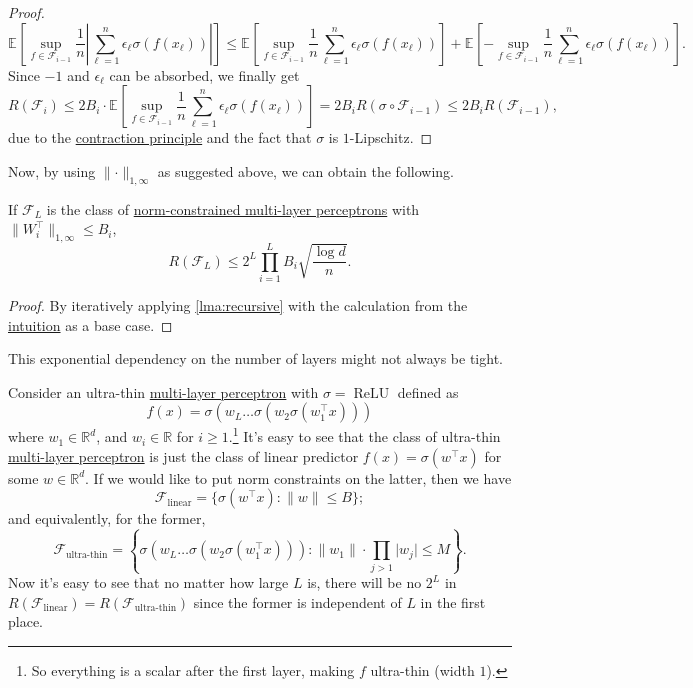 \begin{proof}
	\[
		\mathbb{E}_{}\left[ \sup _{f\in \mathscr{F} _{i-1}} \frac{1}{n} \left\vert \sum_{\ell = 1}^{n} \epsilon _{\ell } \sigma (f(x_{\ell })) \right\vert \right]
		\leq \mathbb{E}_{}\left[\sup _{f\in \mathscr{F} _{i-1}} \frac{1}{n} \sum_{\ell = 1}^{n} \epsilon _{\ell } \sigma (f(x_{\ell })) \right] + \mathbb{E}_{}\left[-\sup _{f\in \mathscr{F} _{i-1}} \frac{1}{n} \sum_{\ell = 1}^{n} \epsilon _{\ell } \sigma (f(x_{\ell })) \right] .
	\]
	Since \(-1\) and \(\epsilon _{\ell }\) can be absorbed, we finally get
	\[
		R(\mathscr{F} _i)
		\leq 2 B_i \cdot \mathbb{E}_{}\left[\sup _{f\in \mathscr{F} _{i-1}} \frac{1}{n} \sum_{\ell = 1}^{n} \epsilon _{\ell } \sigma (f(x_{\ell })) \right]
		= 2 B_i R(\sigma \circ \mathscr{F} _{i-1})
		\leq 2 B_i R(\mathscr{F} _{i-1}),
	\]
	due to the \hyperref[thm:contraction-principle]{contraction principle} and the fact that \(\sigma \) is \(1\)-Lipschitz.
\end{proof}

Now, by using \(\lVert \cdot \rVert _{1, \infty }\) as suggested above, we can obtain the following.

\begin{corollary}
	If \(\mathscr{F} _L\) is the class of \hyperref[def:norm-MLP]{norm-constrained multi-layer perceptrons} with \(\lVert W_i ^{\top} \rVert _{1, \infty } \leq B_i\),
	\[
		R(\mathscr{F} _L) \leq 2^L \prod _{i=1}^{L} B_i \sqrt{\frac{\log d}{n}} .
	\]
\end{corollary}
\begin{proof}
	By iteratively applying \autoref{lma:recursive} with the calculation from the \hyperref[int:recursive]{intuition} as a base case.
\end{proof}

This exponential dependency on the number of layers might not always be tight.

\begin{eg}
	Consider an ultra-thin \hyperref[def:MLP]{multi-layer perceptron} with \(\sigma = \operatorname{ReLU}\) defined as
	\[
		f(x) = \sigma (w_L \dots \sigma (w_2 \sigma (w_1 ^{\top} x)))
	\]
	where \(w_1 \in \mathbb{R} ^d\), and \(w_i \in \mathbb{R} \) for \(i \geq 1\).\footnote{So everything is a scalar after the first layer, making \(f\) ultra-thin (width \(1\)).} It's easy to see that the class of ultra-thin \hyperref[def:MLP]{multi-layer perceptron} is just the class of linear predictor \(f(x) = \sigma (w^{\top} x)\) for some \(w\in \mathbb{R} ^d\). If we would like to put norm constraints on the latter, then we have
	\[
		\mathscr{F} _{\text{linear} } = \{ \sigma (w^{\top} x) \colon \lVert w \rVert \leq B \} ;
	\]
	and equivalently, for the former,
	\[
		\mathscr{F} _{\text{ultra-thin} } = \left\{ \sigma (w_L \dots \sigma (w_2 \sigma (w_1 ^{\top} x))) \colon \lVert w_1 \rVert \cdot \prod _{j > 1} \vert w_j \vert \leq M \right\} .
	\]
	Now it's easy to see that no matter how large \(L\) is, there will be no \(2^L\) in \(R(\mathscr{F} _{\text{linear} }) = R(\mathscr{F} _{\text{ultra-thin} })\) since the former is independent of \(L\) in the first place.
\end{eg}

